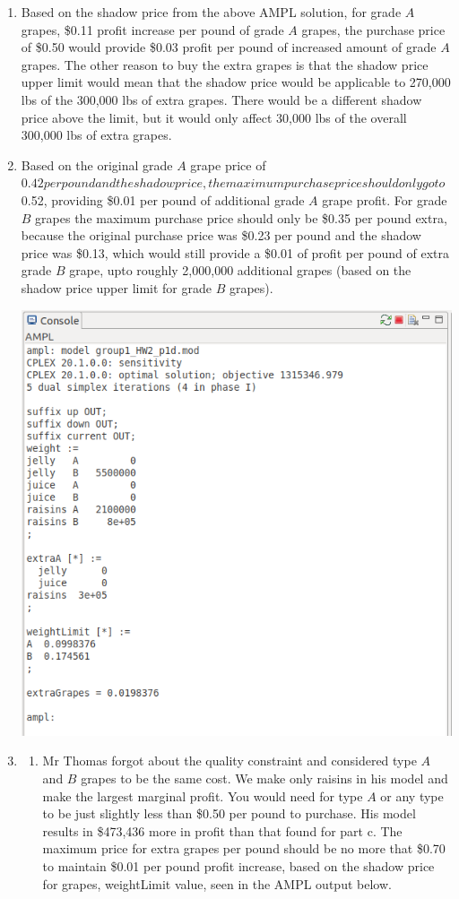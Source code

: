 \documentclass[11pt]{article}
\begin{document}
\begin{enumerate}
\begin{enumerate}
\item Based on the shadow price from the above AMPL solution, for grade $A$ grapes, \$0.11 profit increase per pound of grade $A$ grapes, the purchase price of \$0.50 would provide \$0.03 profit per pound of increased amount of grade $A$ grapes.  The other reason to buy the extra grapes is that the shadow price upper limit would mean that the shadow price would be applicable to 270,000 lbs of the 300,000 lbs of extra grapes.  There would be a different shadow price above the limit, but it would only affect 30,000 lbs of the overall 300,000 lbs of extra grapes. 
\item Based on the original grade $A$ grape price of $0.42 per pound and the shadow price, the maximum purchase price should only go to\ $0.52, providing \$0.01 per pound of additional grade $A$ grape profit.  For grade $B$ grapes the maximum purchase price should only be \$0.35 per pound extra, because the original purchase price was \$0.23 per pound and the shadow price was \$0.13, which would still provide a \$0.01 of profit per pound of extra grade $B$ grape, upto roughly 2,000,000 additional grapes (based on the shadow price upper limit for grade $B$ grapes).

\includegraphics[width=.9\textwidth]{outputp1db.png}

\item 
\begin{enumerate}
\item Mr Thomas forgot about the quality constraint and considered type $A$ and $B$ grapes to be the same cost.  We make only raisins in his model and make the largest marginal profit.  You would need for type $A$ or any type to be just slightly less than \$0.50 per pound to purchase.  His model results in \$473,436 more in profit than that found for part c.  The maximum price for extra grapes per pound should be no more that \$0.70 to maintain \$0.01 per pound profit increase, based on the shadow price for grapes, weightLimit value, seen in the AMPL output below. 


\end{enumerate}
\end{enumerate}
\end{enumerate}
\end{document}
